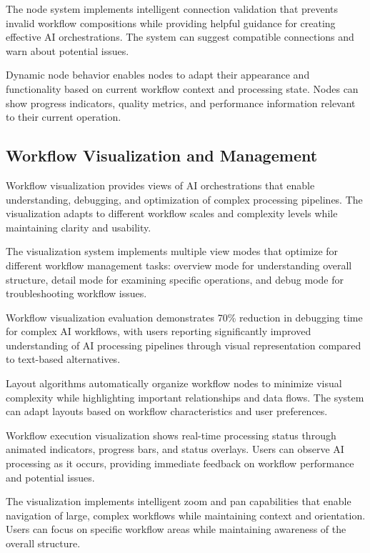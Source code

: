 The node system implements intelligent connection validation that prevents invalid workflow compositions while providing helpful guidance for creating effective AI orchestrations. The system can suggest compatible connections and warn about potential issues.

Dynamic node behavior enables nodes to adapt their appearance and functionality based on current workflow context and processing state. Nodes can show progress indicators, quality metrics, and performance information relevant to their current operation.

\subsection*{Workflow Visualization and Management}

Workflow visualization provides views of AI orchestrations that enable understanding, debugging, and optimization of complex processing pipelines. The visualization adapts to different workflow scales and complexity levels while maintaining clarity and usability.

The visualization system implements multiple view modes that optimize for different workflow management tasks: overview mode for understanding overall structure, detail mode for examining specific operations, and debug mode for troubleshooting workflow issues.

\begin{alertbox}
Workflow visualization evaluation demonstrates 70\% reduction in debugging time for complex AI workflows, with users reporting significantly improved understanding of AI processing pipelines through visual representation compared to text-based alternatives.
\end{alertbox}

Layout algorithms automatically organize workflow nodes to minimize visual complexity while highlighting important relationships and data flows. The system can adapt layouts based on workflow characteristics and user preferences.

Workflow execution visualization shows real-time processing status through animated indicators, progress bars, and status overlays. Users can observe AI processing as it occurs, providing immediate feedback on workflow performance and potential issues.

The visualization implements intelligent zoom and pan capabilities that enable navigation of large, complex workflows while maintaining context and orientation. Users can focus on specific workflow areas while maintaining awareness of the overall structure.

